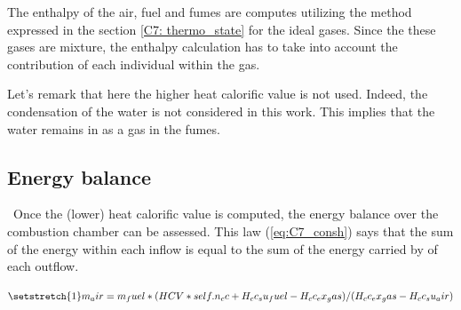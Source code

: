 The enthalpy of the air, fuel and fumes are computes utilizing the method expressed in the section \ref{C7: thermo_state} for the ideal gases. Since the these gases are mixture, the enthalpy calculation has to take into account the contribution of each individual within the gas.

Let's remark that here the higher heat calorific value is not used. Indeed, the condensation of the water is not considered in this work. This implies that the water remains in as a gas in the fumes.

\subsection{Energy balance}
\quad\ Once the (lower) heat calorific value is computed, the energy balance over the combustion chamber can be assessed. 
This law (\ref{eq:C7_consh}) says that the sum of the energy within each inflow is equal to the sum of the energy carried by of each outflow. 

\begin{equation}
    \setstretch{1}
    m_air = m_fuel * (HCV * self.n_cc + H_cc_su_fuel - H_cc_ex_gas) / (H_cc_ex_gas - H_cc_su_air)
\end{equation}